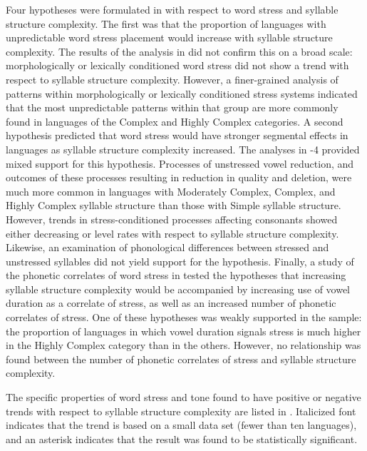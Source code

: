   Four hypotheses were formulated in  with respect to word stress and syllable structure complexity. The first was that the proportion of languages with unpredictable word stress placement would increase with syllable structure complexity. The results of the analysis in  did not confirm this on a broad scale: morphologically or lexically conditioned word stress did not show a trend with respect to syllable structure complexity. However, a finer-grained analysis of patterns within morphologically or lexically conditioned stress systems indicated that the most unpredictable patterns within that group are more commonly found in languages of the Complex and Highly Complex categories. A second hypothesis predicted that word stress would have stronger segmental effects in languages as syllable structure complexity increased. The analyses in -4 provided mixed support for this hypothesis. Processes of unstressed vowel reduction, and outcomes of these processes resulting in reduction in quality and deletion, were much more common in languages with Moderately Complex, Complex, and Highly Complex syllable structure than those with Simple syllable structure. However, trends in stress-conditioned processes affecting consonants showed either decreasing or level rates with respect to syllable structure complexity. Likewise, an examination of phonological differences between stressed and unstressed syllables did not yield support for the hypothesis. Finally, a study of the phonetic correlates of word stress in  tested the hypotheses that increasing syllable structure complexity would be accompanied by increasing use of vowel duration as a correlate of stress, as well as an increased number of phonetic correlates of stress. One of these hypotheses was weakly supported in the sample: the proportion of languages in which vowel duration signals stress is much higher in the Highly Complex category than in the others. However, no relationship was found between the number of phonetic correlates of stress and syllable structure complexity.

  The specific properties of word stress and tone found to have positive or negative trends with respect to syllable structure complexity are listed in . Italicized font indicates that the trend is based on a small data set (fewer than ten languages), and an asterisk indicates that the result was found to be statistically significant.

